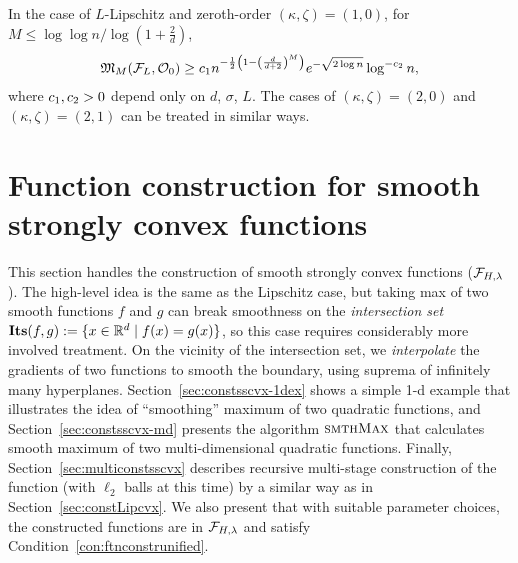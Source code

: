 In the case of $L$-Lipschitz and zeroth-order $(\kappa, \zeta) = (1,0)$, for $M \leq \log\log n/\log(1+\frac{2}{d})$,
\begin{equation*}
\begin{array}{l}
	\mathfrak{M}_M(\mathcal{F}_{L}, \mathcal{O}_0) 
	\geq 
		c_1 n^{-\frac{1}{2} \left (1 - \left( \frac{d}{d+2} \right)^M\right )  } 
		e^{- \sqrt{2 \log n}} \log^{-c_2} n,
\end{array}
\end{equation*}
where $c_1, c_2>0$ depend only on $d$, $\sigma$, $L$.
The cases of $(\kappa, \zeta) = (2,0)$ and $(\kappa, \zeta) = (2,1)$ can be treated in similar ways.

\section{Function construction for smooth strongly convex functions}
\label{sec:constsscvx}

This section handles the construction of smooth strongly convex functions ($\mathcal{F}_{H, \lambda}$). The high-level idea is the same as the Lipschitz case, but 
taking max of two smooth functions $f$ and $g$ can break smoothness on the \emph{intersection set} $\mathbf{Its}({f},{g}) := \{x \in \mathbb{R}^d \mid f(x) = g(x) \}$, so this case requires considerably more involved treatment. On the vicinity of the intersection set, we \emph{interpolate} the gradients of two functions to smooth the boundary, using suprema of infinitely many hyperplanes.
Section~\ref{sec:constsscvx-1dex} shows a simple 1-d example that illustrates the idea of ``smoothing'' maximum of two quadratic functions, and Section~\ref{sec:constsscvx-md} presents the algorithm $\textsc{smthMax}$ that calculates smooth maximum of two multi-dimensional quadratic functions. Finally, Section~\ref{sec:multiconstsscvx} describes recursive multi-stage construction of the function (with $\ell_2$ balls at this time) by a similar way as in Section~\ref{sec:constLipcvx}.
We also present that with suitable parameter choices, the constructed functions are in $\mathcal{F}_{H,\lambda}$ and satisfy Condition~\ref{con:ftnconstrunified}.

